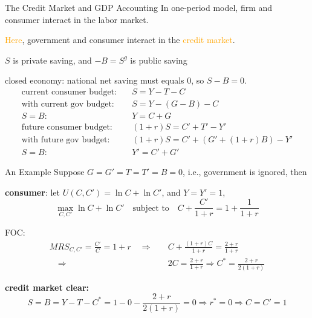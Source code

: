\documentclass[11pt,aspectratio=169,usenames,dvipsnames]{beamer}
\newcommand{\orange}[1]{\textcolor{orange}{#1}}
\let\tempone\itemize
\let\temptwo\enditemize
\renewenvironment{itemize}{\tempone\addtolength{\itemsep}{\fill}}{\temptwo}
\begin{document}
\begin{frame}{The Credit Market and GDP Accounting}
\label{slide:The_Credit_Market_and_GDP_Accounting}
    In \alert{one-period} model, firm and consumer interact in the \alert{labor market}.

    \orange{Here}, government and consumer interact in the \orange{credit market}.
    \begin{itemize}
        \item $ S $ is \alert{private saving}, and $ -B = S^{g} $ is \alert{public saving}
        \item closed economy: national net saving must equals $ 0 $, so $ S - B = 0 $.
        \begin{align*}
            \text{current consumer budget:} \quad
                & S = Y - T - C
            \\
            \text{with current gov budget:} \quad
                & S = Y - ( G-B ) - C
            \\
            S = B: \quad
                & Y = C + G
            \\
            \text{future consumer budget:} \quad
                & ( 1+r ) S = C' + T' - Y'
            \\
            \text{with future gov budget:} \quad
                & ( 1+r ) S = C' + ( G' + ( 1+r ) B ) - Y'
            \\
            S = B: \quad
                & Y' = C' + G'
        \end{align*}
    \end{itemize}
\end{frame}

\begin{frame}{An Example}
\label{slide:An_Example}
    Suppose $ G = G' = T = T' = B = 0 $, i.e., government is ignored, then
    \begin{itemize}
        \item \textbf{consumer}: let $ U( C, C' ) = \ln C + \ln C' $, and $ Y = Y' = 1 $,
        \begin{equation*}
            \max_{C, C'} \ln C + \ln C' \quad \text{subject to} \quad C + \frac{C'}{1+r} = 1 + \frac{1}{1+r}
        \end{equation*}
        \item FOC:
        \begin{align*}
            MRS_{C, C'} = \frac{C'}{C} = 1+r \quad \Rightarrow \quad
                & C + \frac{(1+r)C}{1+r} = \frac{2+r}{1+r}
            \\
            \quad \Rightarrow \quad
                & 2C = \frac{2+r}{1+r} \Rightarrow C^{*} = \frac{2+r}{2( 1+r )}
        \end{align*}
        \item \textbf{credit market clear:}
        \begin{equation*}
            S = B = Y - T - C^{*} = 1 - 0 - \frac{2+r}{2( 1+r )} = 0 \Rightarrow r^{*} = 0 \Rightarrow C = C' = 1
        \end{equation*}
    \end{itemize}
\end{frame}
\end{document}
